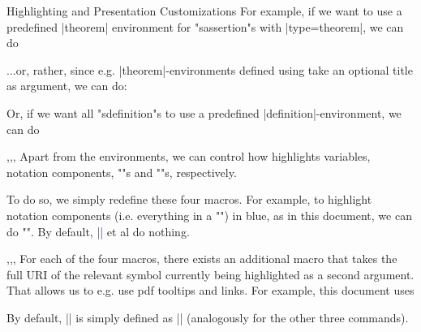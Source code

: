 \begin{sfragment}[id=sec.customhighlight]{Highlighting and Presentation Customizations}
  For example, if we want to use a predefined |theorem| environment for
  \stexcode"sassertion"s with |type=theorem|, we can do
\begin{latexcode}[gobble=6]
      \stexpatchassertion[theorem]{\begin{theorem}}{\end{theorem}}
    \end{latexcode}
    ...or, rather, since e.g. |theorem|-environments defined using
     take an optional title as argument, we can do:
    \begin{latexcode}[gobble=6]
      \stexpatchassertion[theorem]
        {\ifx\sassertiontitle\@empty
            \begin{theorem}
          \else
            \begin{theorem}[\sassertiontitle]
        \fi}
        {\end{theorem}}    
    \end{latexcode}

    Or, if we want all \stexcode"sdefinition"s to use a predefined
    |definition|-environment, we can do
    \begin{latexcode}[gobble=6]
      \stexpatchdefinition
        {\ifx\sdefinitiontitle\@empty
            \begin{definition}
          \else
            \begin{definition}[\sdefinitiontitle]
        \fi}
        {\end{definition}}
    \end{latexcode}

    \begin{function}{\compemph,\varemph,\symrefemph,}
      Apart from the environments, we can control how \sTeX highlights
      variables, notation components, \stexcode"\symref"s and
      \stexcode""s, respectively.

      To do so, we simply redefine these four macros. For example,
      to highlight notation components (i.e. everything in a 
      \stexcode"\comp") in blue, as in this document, we can do
      \stexcode"\def\compemph#1{\textcolor{blue}{#1}}".
      By default, |\compemph| et al do nothing.
    \end{function}

    \begin{function}{\compemph@uri,\varemph@uri,\symrefemph@uri,}
      For each of the four macros, there exists an additional macro that takes
      the full URI of the relevant symbol currently being highlighted
      as a second argument. That allows us to e.g. use pdf tooltips
      and links. For example, this document uses
      \begin{latexcode}[gobble=8]
        \protected{}
      \end{latexcode}
      By default, |\compemph@uri| is simply defined
      as || (analogously for the other three commands).
    \end{function}


\end{sfragment}
